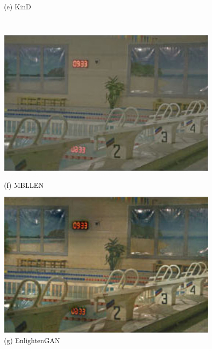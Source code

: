 \documentclass[CJK,aspectratio=169]{beamer}  %
\begin{document}
\begin{frame}
\begin{figure}
\begin{minipage}{0.19\textwidth}
			\caption*{\tiny (e) KinD}
			\label{fig: KinD}	
		\end{minipage}\\
		\vspace{-0.3cm}
		\begin{minipage}{0.19\textwidth}
			\includegraphics[width=\linewidth]{picture/LLIE/Efficent/MBLLEN}
			\caption*{\tiny (f) MBLLEN}
			\label{fig: MBLLEN_contrast}	
		\end{minipage}
		\begin{minipage}{0.19\textwidth}
			\includegraphics[width=\linewidth]{picture/LLIE/Efficent/EnlightenGAN}
			\caption*{\tiny (g) EnlightenGAN}
			\label{fig: LLI EnlightenGAN}	
		\end{minipage}
		\begin{minipage}{0.19\textwidth}

\end{minipage}
\end{figure}
\end{frame}
\end{document}
